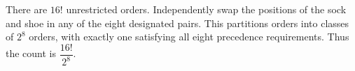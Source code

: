 There are $16!$ unrestricted orders. Independently swap the positions of the sock and shoe in any of the eight designated pairs. This partitions orders into classes of $2^8$ orders, with exactly one satisfying all eight precedence requirements. Thus the count is $\boxed{\dfrac{16!}{2^8}}$.
